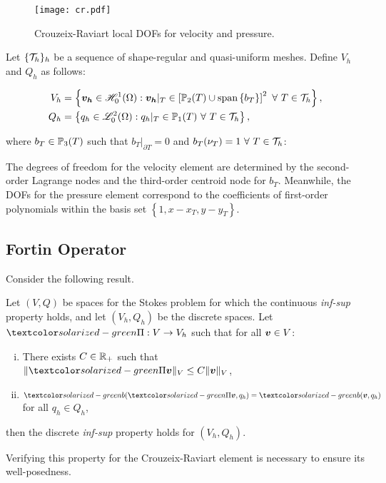 \begin{figure}[!ht]
	\centering
	\texttt{[image: cr.pdf]}
	\caption{Crouzeix-Raviart local DOFs for velocity and pressure.}
\end{figure}

Let $\{\mathcal{T}_h\}_h$ be a sequence of shape-regular and quasi-uniform meshes. Define $V_h$ and $Q_h$ as follows:

\begin{align}
    V_h &= \left\{ \bm{v_h} \in \mathscr{H}^1_0(\Omega): \bm{v_h} \vert_T \in \left[ \mathbb{P}_{2}(T) \cup \text{span} \left\{ b_T \right\} \right]^2 ~ \forall ~ T \in \mathcal{T}_h \right\}, \\
    Q_h &= \left\{ q_h \in \mathscr{L}^2_0(\Omega): q_h \vert_T \in \mathbb{P}_{1}(T) ~ \forall ~ T \in \mathcal{T}_h \right\},
\end{align}

where $b_T \in \mathbb{P}_{3}(T)$ such that $b_T \vert_{\partial T} = 0$ and $b_T(\nu_T) = 1 ~ \forall ~ T \in \mathcal{T}_h$:

The degrees of freedom for the velocity element are determined by the second-order Lagrange nodes and the third-order centroid node for $b_T$. Meanwhile, the DOFs for the pressure element correspond to the coefficients of first-order polynomials within the basis set $\left\{ 1, x - x_T, y - y_T \right\}$.

\subsection{Fortin Operator}

Consider the following result.

\begin{lemma}[Fortin] \label{fortin}
    Let $(V, Q)$ be spaces for the Stokes problem for which the continuous \textit{inf-sup} property holds, and let $(V_h, Q_h)$ be the discrete spaces. Let $\fortin: V \rightarrow V_h$ such that for all $\bm{v} \in V$:
    \begin{enumerate}[i.]
        \item There exists $C \in \mathbb{R}_+$ such that $\lVert \fortin \Vector{v} \rVert_V \leq C \lVert \Vector{v} \rVert_V$,
        \item $\bob{\fortin \Vector{v}}{q_h} = \bob{\Vector{v}}{q_h}$ for all $q_h \in Q_h$,
    \end{enumerate}
    then the discrete \textit{inf-sup} property holds for $(V_h, Q_h)$.
\end{lemma}

Verifying this property for the Crouzeix-Raviart element is necessary to ensure its well-posedness.

